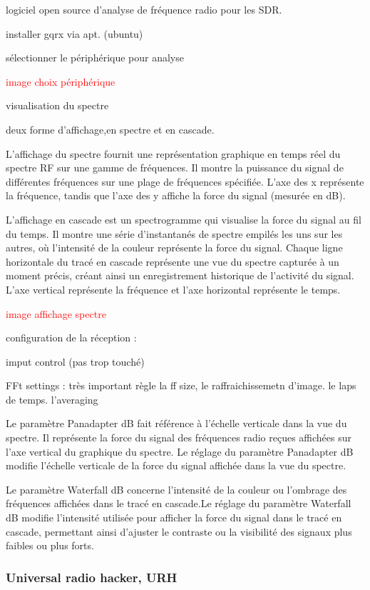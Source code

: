 \documentclass[12pt,a4paper,oneside, titlepage]{report}
\begin{document}
logiciel open source d'analyse de fréquence radio pour les SDR.

installer gqrx via apt. (ubuntu)

sélectionner le périphérique pour analyse

\textcolor{red}{image choix périphérique}

visualisation du spectre

deux forme d'affichage,en spectre et en cascade.

L'affichage du spectre fournit une représentation graphique en temps réel du spectre RF sur une gamme de fréquences.
Il montre la puissance du signal de différentes fréquences sur une plage de fréquences spécifiée.
L'axe des x représente la fréquence, tandis que l'axe des y affiche la force du signal (mesurée en dB).

L'affichage en cascade est un spectrogramme qui visualise la force du signal au fil du temps.
Il montre une série d'instantanés de spectre empilés les uns sur les autres, où l'intensité de la couleur représente la force du signal.
Chaque ligne horizontale du tracé en cascade représente une vue du spectre capturée à un moment précis, créant ainsi un enregistrement historique de l'activité du signal.
L'axe vertical représente la fréquence et l'axe horizontal représente le temps.

\textcolor{red}{image affichage spectre}

configuration de la réception :

imput control (pas trop touché)

FFt settings : très important règle la ff size, le raffraichissemetn d'image. le laps de temps. l'averaging

Le paramètre Panadapter dB fait référence à l'échelle verticale dans la vue du spectre. Il représente la force du signal des fréquences radio reçues affichées sur l'axe vertical du graphique du spectre. Le réglage du paramètre Panadapter dB modifie l’échelle verticale de la force du signal affichée dans la vue du spectre.

Le paramètre Waterfall dB concerne l'intensité de la couleur ou l'ombrage des fréquences affichées dans le tracé en cascade.Le réglage du paramètre Waterfall dB modifie l'intensité utilisée pour afficher la force du signal dans le tracé en cascade, permettant ainsi d'ajuster le contraste ou la visibilité des signaux plus faibles ou plus forts.


\subsubsection{Universal radio hacker, URH}
\end{document}
